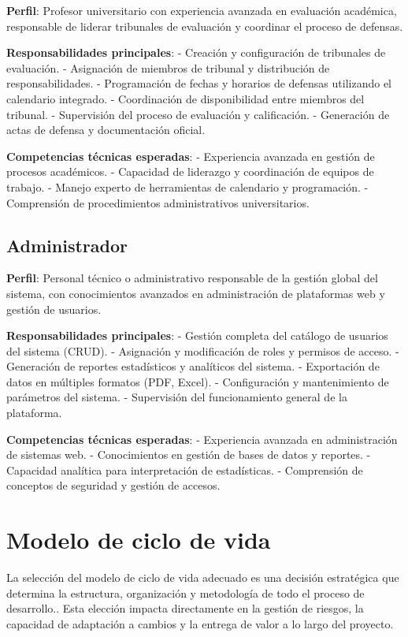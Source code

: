 \documentclass[12pt,a4paper,oneside]{report}
\begin{document}
\textbf{Perfil}: Profesor universitario con experiencia avanzada en
evaluación académica, responsable de liderar tribunales de evaluación y
coordinar el proceso de defensas.

\textbf{Responsabilidades principales}: - Creación y configuración de
tribunales de evaluación. - Asignación de miembros de tribunal y
distribución de responsabilidades. - Programación de fechas y horarios
de defensas utilizando el calendario integrado. - Coordinación de
disponibilidad entre miembros del tribunal. - Supervisión del proceso de
evaluación y calificación. - Generación de actas de defensa y
documentación oficial.

\textbf{Competencias técnicas esperadas}: - Experiencia avanzada en
gestión de procesos académicos. - Capacidad de liderazgo y coordinación
de equipos de trabajo. - Manejo experto de herramientas de calendario y
programación. - Comprensión de procedimientos administrativos
universitarios.

\subsection{Administrador}\label{administrador}

\textbf{Perfil}: Personal técnico o administrativo responsable de la
gestión global del sistema, con conocimientos avanzados en
administración de plataformas web y gestión de usuarios.

\textbf{Responsabilidades principales}: - Gestión completa del catálogo
de usuarios del sistema (CRUD). - Asignación y modificación de roles y
permisos de acceso. - Generación de reportes estadísticos y analíticos
del sistema. - Exportación de datos en múltiples formatos (PDF, Excel).
- Configuración y mantenimiento de parámetros del sistema. - Supervisión
del funcionamiento general de la plataforma.

\textbf{Competencias técnicas esperadas}: - Experiencia avanzada en
administración de sistemas web. - Conocimientos en gestión de bases de
datos y reportes. - Capacidad analítica para interpretación de
estadísticas. - Comprensión de conceptos de seguridad y gestión de
accesos.

\section{Modelo de ciclo de vida}\label{modelo-de-ciclo-de-vida}

La selección del modelo de ciclo de vida adecuado es una decisión
estratégica que determina la estructura, organización y metodología de
todo el proceso de desarrollo.. Esta elección impacta directamente en la
gestión de riesgos, la capacidad de adaptación a cambios y la entrega de
valor a lo largo del proyecto.
\end{document}
